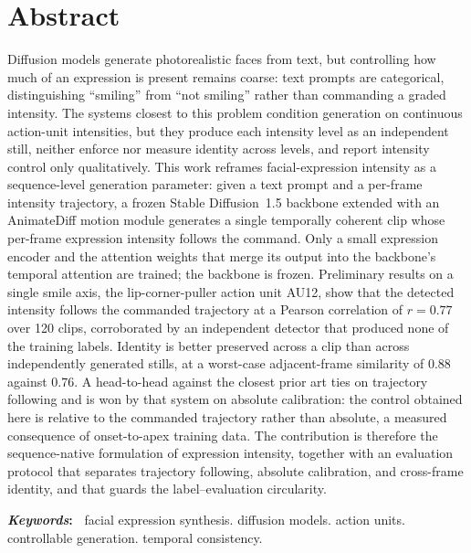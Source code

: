 \chapter*{Abstract}


\noindent Diffusion models generate photorealistic faces from text, but controlling how much of an
expression is present remains coarse: text prompts are categorical, distinguishing ``smiling''
from ``not smiling'' rather than commanding a graded intensity. The systems closest to this
problem condition generation on continuous action-unit intensities, but they produce each
intensity level as an independent still, neither enforce nor measure identity across levels, and
report intensity control only qualitatively. This work reframes facial-expression intensity as a
sequence-level generation parameter: given a text prompt and a per-frame intensity trajectory, a
frozen Stable Diffusion~1.5 backbone extended with an AnimateDiff motion module generates a single
temporally coherent clip whose per-frame expression intensity follows the command. Only a small
expression encoder and the attention weights that merge its output into the backbone's temporal
attention are trained; the backbone is frozen. Preliminary results on a single smile axis, the
lip-corner-puller action unit AU12, show that the detected intensity follows the commanded
trajectory at a Pearson correlation of $r = 0.77$ over 120 clips, corroborated by an
independent detector that produced none of the training labels. Identity is better preserved
across a clip than across independently generated stills, at a worst-case adjacent-frame
similarity of $0.88$ against $0.76$. A head-to-head against the closest prior art ties on
trajectory following and is won by that system on absolute calibration: the control obtained
here is relative to the commanded trajectory rather than absolute, a measured consequence of
onset-to-apex training data. The contribution is therefore the sequence-native formulation of expression intensity, together with an evaluation protocol that separates trajectory following, absolute calibration, and cross-frame identity, and that guards the label--evaluation circularity.

\vspace{1em}
\noindent\textbf{\textit{Keywords}:~} facial expression synthesis. diffusion models. action units. controllable generation. temporal consistency.
